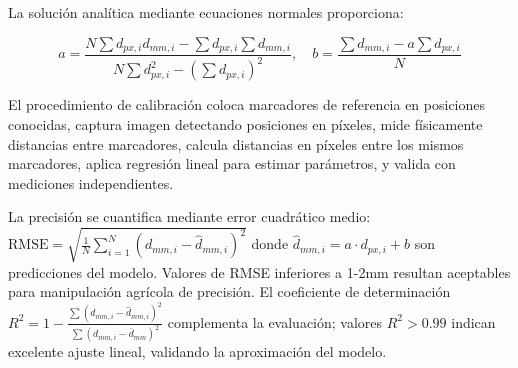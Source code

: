 La solución analítica mediante ecuaciones normales proporciona:

\begin{equation}
a = \frac{N\sum d_{px,i}d_{mm,i} - \sum d_{px,i}\sum d_{mm,i}}{N\sum d_{px,i}^2 - (\sum d_{px,i})^2}, \quad b = \frac{\sum d_{mm,i} - a\sum d_{px,i}}{N}
\end{equation}

El procedimiento de calibración coloca marcadores de referencia en posiciones conocidas, captura imagen detectando posiciones en píxeles, mide físicamente distancias entre marcadores, calcula distancias en píxeles entre los mismos marcadores, aplica regresión lineal para estimar parámetros, y valida con mediciones independientes.

La precisión se cuantifica mediante error cuadrático medio: $\text{RMSE} = \sqrt{\frac{1}{N}\sum_{i=1}^{N}(d_{mm,i} - \hat{d}_{mm,i})^2}$ donde $\hat{d}_{mm,i} = a \cdot d_{px,i} + b$ son predicciones del modelo. Valores de RMSE inferiores a 1-2mm resultan aceptables para manipulación agrícola de precisión. El coeficiente de determinación $R^2 = 1 - \frac{\sum (d_{mm,i} - \hat{d}_{mm,i})^2}{\sum (d_{mm,i} - \bar{d}_{mm})^2}$ complementa la evaluación; valores $R^2 > 0.99$ indican excelente ajuste lineal, validando la aproximación del modelo.
